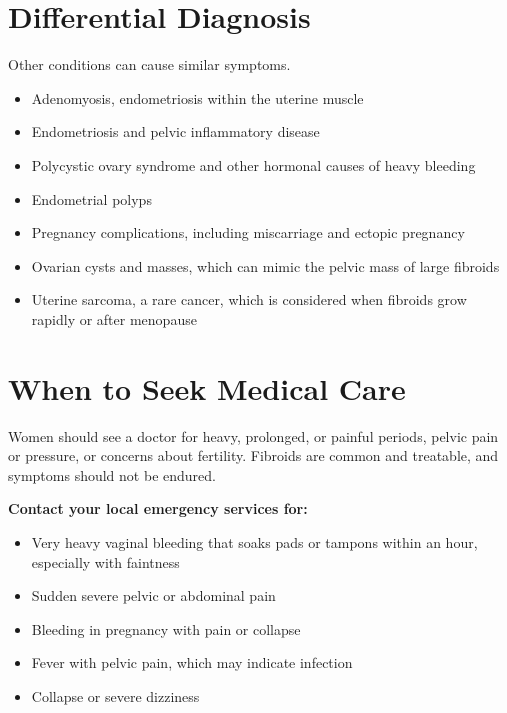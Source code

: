 \section*{Differential Diagnosis}
Other conditions can cause similar symptoms.
\begin{itemize}
    \item Adenomyosis, endometriosis within the uterine muscle
    \item Endometriosis and pelvic inflammatory disease
    \item Polycystic ovary syndrome and other hormonal causes of heavy bleeding
    \item Endometrial polyps
    \item Pregnancy complications, including miscarriage and ectopic pregnancy
    \item Ovarian cysts and masses, which can mimic the pelvic mass of large fibroids
    \item Uterine sarcoma, a rare cancer, which is considered when fibroids grow rapidly or after menopause
\end{itemize}

\section*{When to Seek Medical Care}
Women should see a doctor for heavy, prolonged, or painful periods, pelvic pain or pressure, or concerns about fertility. Fibroids are common and treatable, and symptoms should not be endured.

\textbf{Contact your local emergency services for:}
\begin{itemize}
    \item Very heavy vaginal bleeding that soaks pads or tampons within an hour, especially with faintness
    \item Sudden severe pelvic or abdominal pain
    \item Bleeding in pregnancy with pain or collapse
    \item Fever with pelvic pain, which may indicate infection
    \item Collapse or severe dizziness
\end{itemize}

